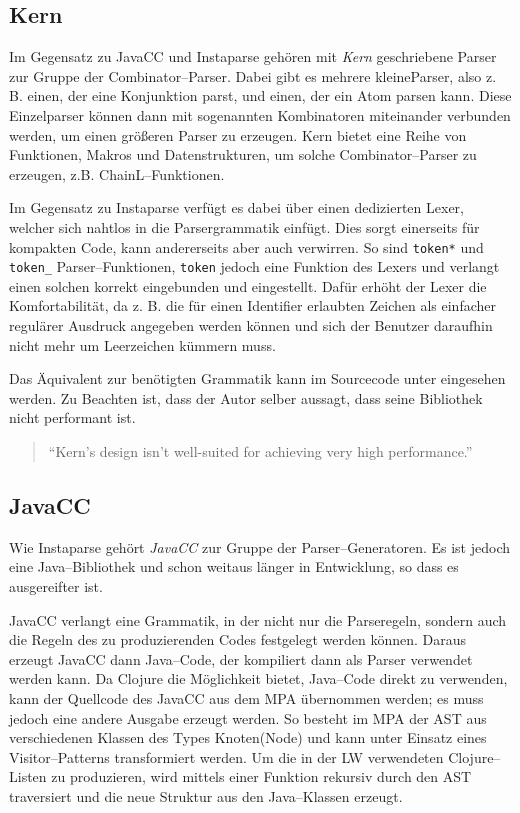 \documentclass[ngerman,a4paper,abstracton,open=right,twoside=false,toc=listofnumbered,bibtotocnumbered]{scrreprt}
\begin{document}
\subsection{Kern}

Im Gegensatz zu JavaCC und Instaparse gehören mit \emph{Kern} geschriebene Parser zur Gruppe der Combinator--Parser. Dabei gibt es mehrere \glqq kleine\grqq Parser, also z. B. einen, der eine Konjunktion parst, und einen, der ein Atom parsen kann. Diese Einzelparser können dann mit sogenannten Kombinatoren miteinander verbunden werden, um einen größeren Parser zu erzeugen. Kern bietet eine Reihe von Funktionen, Makros und Datenstrukturen, um solche Combinator--Parser zu erzeugen, z.B. ChainL--Funktionen.

Im Gegensatz zu Instaparse verfügt es dabei über einen dedizierten Lexer, welcher sich nahtlos in die Parsergrammatik einfügt. Dies sorgt einerseits für kompakten Code, kann andererseits aber auch verwirren. So sind \lstinline|token*| und \lstinline|token_| Parser--Funktionen, \lstinline|token| jedoch eine Funktion des Lexers und verlangt einen solchen korrekt eingebunden und eingestellt. Dafür erhöht der Lexer die Komfortabilität, da z. B. die für einen Identifier erlaubten Zeichen als einfacher regulärer Ausdruck angegeben werden können und sich der Benutzer daraufhin nicht mehr um Leerzeichen kümmern muss.

Das Äquivalent zur benötigten Grammatik kann im Sourcecode unter \cite{lw} eingesehen werden. Zu Beachten ist, dass der Autor selber aussagt, dass seine Bibliothek nicht performant ist. 

\begin{quote}
	``Kern's design isn't well-suited for achieving very high performance.'' \cite{kern}
\end{quote}

\subsection{JavaCC}\label{JavaCC}

Wie Instaparse gehört \emph{JavaCC} zur Gruppe der Parser--Generatoren. Es ist jedoch eine Java--Bibliothek und schon weitaus länger in Entwicklung, so dass es ausgereifter ist. \cite{javacc}

JavaCC verlangt eine Grammatik, in der nicht nur die Parseregeln, sondern auch die Regeln des zu produzierenden Codes festgelegt werden können. Daraus erzeugt JavaCC dann Java--Code, der kompiliert dann als Parser verwendet werden kann. Da Clojure die Möglichkeit bietet, Java--Code direkt zu verwenden, kann der Quellcode des JavaCC aus dem MPA übernommen werden; es muss jedoch eine andere Ausgabe erzeugt werden. So besteht im MPA der AST aus verschiedenen Klassen des Types \glqq Knoten\grqq (Node) und kann unter Einsatz eines Visitor--Patterns transformiert werden. Um die in der LW verwendeten Clojure--Listen zu produzieren, wird mittels einer Funktion rekursiv durch den AST traversiert und die neue Struktur aus den Java--Klassen erzeugt.
\end{document}
